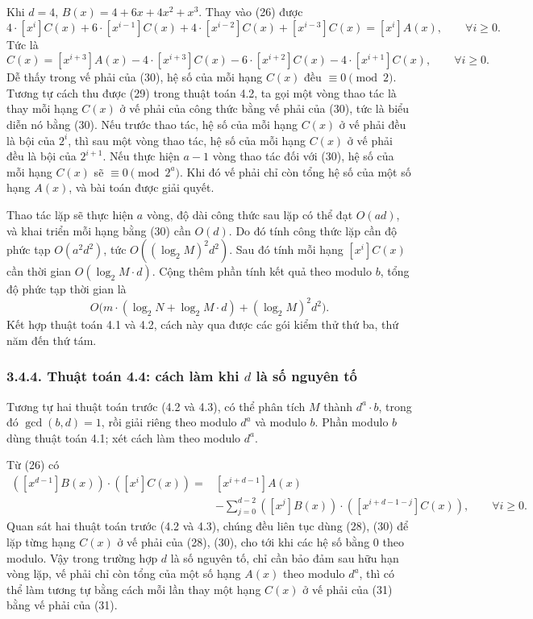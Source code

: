 \documentclass[11pt]{article}
\begin{document}
Khi \(d=4\), \(B(x)=4+6x+4x^2+x^3\). Thay vào (26) được
\[
  4\cdot[x^i]C(x)+6\cdot[x^{i-1}]C(x)+4\cdot[x^{i-2}]C(x)
  +[x^{i-3}]C(x)=[x^i]A(x),\qquad \forall i\ge0.
\]
Tức là
\begin{equation*}
  [x^i]C(x)=[x^{i+3}]A(x)-4\cdot[x^{i+3}]C(x)
  -6\cdot[x^{i+2}]C(x)-4\cdot[x^{i+1}]C(x),
  \qquad \forall i\ge0.
  \tag{30}
\end{equation*}
Dễ thấy trong vế phải của (30), hệ số của mỗi hạng \(C(x)\) đều
\(\equiv0\pmod2\). Tương tự cách thu được (29) trong thuật toán 4.2, ta gọi
một vòng thao tác là thay mỗi hạng \(C(x)\) ở vế phải của công thức bằng vế
phải của (30), tức là biểu diễn nó bằng (30). Nếu trước thao tác, hệ số của
mỗi hạng \(C(x)\) ở vế phải đều là bội của \(2^i\), thì sau một vòng thao tác,
hệ số của mỗi hạng \(C(x)\) ở vế phải đều là bội của \(2^{i+1}\). Nếu thực
hiện \(a-1\) vòng thao tác đối với (30), hệ số của mỗi hạng \(C(x)\) sẽ
\(\equiv0\pmod {2^a}\). Khi đó vế phải chỉ còn tổng hệ số của một số hạng
\(A(x)\), và bài toán được giải quyết.

Thao tác lặp sẽ thực hiện \(a\) vòng, độ dài công thức sau lặp có thể đạt
\(O(ad)\), và khai triển mỗi hạng bằng (30) cần \(O(d)\). Do đó tính công
thức lặp cần độ phức tạp \(O(a^2d^2)\), tức
\(O((\log_2 M)^2d^2)\). Sau đó tính mỗi hạng \([x^i]C(x)\) cần thời gian
\(O(\log_2 M\cdot d)\). Cộng thêm phần tính kết quả theo modulo \(b\), tổng
độ phức tạp thời gian là
\[
  O\bigl(m\cdot(\log_2 N+\log_2 M\cdot d)+(\log_2 M)^2d^2\bigr).
\]
Kết hợp thuật toán 4.1 và 4.2, cách này qua được các gói kiểm thử thứ ba, thứ
năm đến thứ tám.

\subsubsection*{3.4.4. Thuật toán 4.4: cách làm khi \(d\) là số nguyên tố}

Tương tự hai thuật toán trước (4.2 và 4.3), có thể phân tích \(M\) thành
\(d^a\cdot b\), trong đó \(\gcd(b,d)=1\), rồi giải riêng theo modulo \(d^a\)
và modulo \(b\). Phần modulo \(b\) dùng thuật toán 4.1; xét cách làm theo
modulo \(d^a\).

Từ (26) có
\begin{equation*}
\begin{aligned}
  ([x^{d-1}]B(x))\cdot([x^i]C(x))
  ={}&[x^{i+d-1}]A(x)\\
  &-\sum_{j=0}^{d-2}([x^j]B(x))\cdot
    ([x^{i+d-1-j}]C(x)),\qquad \forall i\ge0.
\end{aligned}
\tag{31}
\end{equation*}
Quan sát hai thuật toán trước (4.2 và 4.3), chúng đều liên tục dùng (28),
(30) để lặp từng hạng \(C(x)\) ở vế phải của (28), (30), cho tới khi các hệ
số bằng \(0\) theo modulo. Vậy trong trường hợp \(d\) là số nguyên tố, chỉ cần
bảo đảm sau hữu hạn vòng lặp, vế phải chỉ còn tổng của một số hạng \(A(x)\)
theo modulo \(d^a\), thì có thể làm tương tự bằng cách mỗi lần thay một hạng
\(C(x)\) ở vế phải của (31) bằng vế phải của (31).
\end{document}
